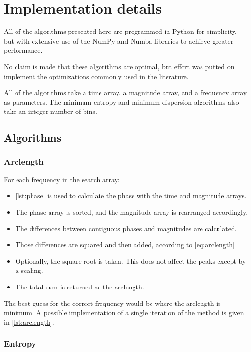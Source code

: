\section{Implementation details}

All of the algorithms presented here are programmed in Python \citep{VanRossum2009} for simplicity,
but with extensive use of the NumPy \citep{vanderWalt2011} and Numba \citep{Lam2015} libraries to achieve greater performance.

No claim is made that these algorithms are optimal, 
but effort was putted on implement the optimizations commonly used in the literature.

All of the algorithms take a time array, a magnitude array, and a frequency array as parameters.
The minimum entropy and minimum dispersion algorithms also take an integer number of bins.

\subsection{Algorithms}

\subsubsection{Arclength}

For each frequency in the search array:

\begin{itemize}
	\item \autoref{lst:phase} is used to calculate the phase with the time and magnitude arrays.
	\item The phase array is sorted, and the magnitude array is rearranged accordingly.
	\item The differences between contiguous phases and magnitudes are calculated.
	\item Those differences are squared and then added, according to \autoref{eq:arclength}
	\item Optionally, the square root is taken. This does not affect the peaks except by a scaling.
	\item The total sum is returned as the arclength.
\end{itemize}

The best guess for the correct frequency would be where the arclength is minimum.
A possible implementation of a single iteration of the method is given in \autoref{lst:arclength}.

\subsubsection{Entropy}

